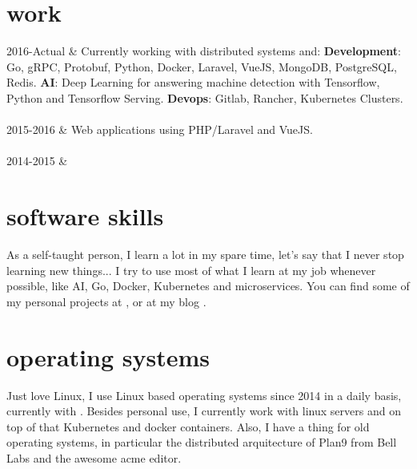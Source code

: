 \documentclass[]{cv-mauri}
\begin{document}
\section*{work}
\begin{tabularcv}
    2016-Actual   &   
                    \newline 
                    Currently working with distributed systems and: \newline
                    \textbf{Development}: Go, gRPC, Protobuf, Python, Docker, Laravel, VueJS, MongoDB, PostgreSQL, Redis.
                    \newline
                    \textbf{AI}: Deep Learning for answering machine detection with Tensorflow, Python and Tensorflow Serving. \newline
                    \textbf{Devops}: Gitlab, Rancher, Kubernetes Clusters.
                    \\[\vspacepar]
                    \\[\vspacepar]
    2015-2016   &   
                    \newline Web applications using PHP/Laravel and VueJS.
                    \\[\vspacepar]
                    \\[\vspacepar]
	2014-2015   &   
\end{tabularcv}

\section*{software skills}
    As a self-taught person, I learn a lot in my spare time, let's say that I never stop learning new things... I try to use most of what I learn at my job whenever possible, like AI, Go, Docker, Kubernetes and microservices. You can find some of my personal projects at \href{https://github.com/mauri870}{\color{maincolor}{https://github.com/mauri870}}, \href{https://mauri870.github.io}{\color{maincolor}{https://mauri870.github.io}} or at my blog \href{https://mauri870.github.io/blog}{\color{maincolor}{https://mauri870.github.io/blog}}.

\section*{operating systems}
	Just love Linux, I use Linux based operating systems since 2014 in a daily basis, currently with \href{https://github.com/mauri870/dot-files}{}. Besides personal use, I currently work with linux servers and on top of that Kubernetes and docker containers. Also, I have a thing for old operating systems, in particular the distributed arquitecture of Plan9 from Bell Labs and the awesome acme editor.
\end{document}
